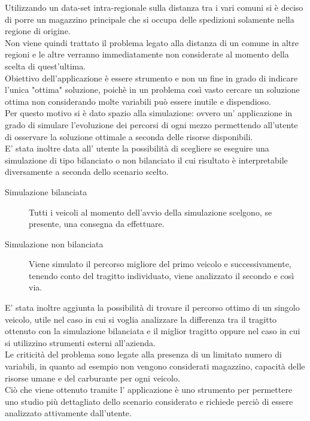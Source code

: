 \documentclass[a4paper,12pt]{report}
\begin{document}
Utilizzando un data-set intra-regionale sulla distanza tra i vari comuni si è deciso di porre un magazzino principale che si occupa delle spedizioni solamente nella regione di origine.\\
Non viene quindi trattato il problema legato alla distanza di un comune in altre regioni e le altre verranno immediatamente non considerate al momento della scelta di quest'ultima.\\
Obiettivo dell'applicazione è essere strumento e non un fine in grado di indicare l'unica "ottima" soluzione, poichè in un problema così vasto cercare un soluzione ottima non considerando 
molte variabili può essere inutile e dispendioso.\\ Per questo motivo si è dato spazio alla simulazione: ovvero un' applicazione in grado di simulare l'evoluzione dei percorsi di ogni mezzo permettendo all'utente di osservare la soluzione ottimale a seconda delle risorse disponibili.\\
E' stata inoltre data all' utente la possibilità di scegliere se eseguire una simulazione di tipo bilanciato o non bilanciato il cui risultato è interpretabile diversamente a seconda dello scenario scelto.
\begin{description}
	\item[Simulazione bilanciata] Tutti i veicoli al momento dell'avvio della simulazione scelgono, se presente, una consegna da effettuare. 
	\item[Simulazione non bilanciata] Viene simulato il percorso migliore del primo veicolo e successivamente, tenendo conto del tragitto individuato, viene analizzato il secondo e così via.
\end{description}
E' stata inoltre aggiunta la possibilità di trovare il percorso ottimo di un singolo veicolo, utile nel caso in cui si voglia analizzare la differenza tra il tragitto ottenuto con la simulazione bilanciata e il miglior tragitto oppure nel caso in cui si utilizzino strumenti esterni all'azienda.\\
Le criticità del problema sono legate alla presenza di un limitato numero di variabili, in quanto ad esempio non vengono considerati magazzino, capacità delle risorse umane e del carburante per ogni veicolo.\\
Ciò che viene ottenuto tramite l' applicazione è uno strumento per permettere uno studio più dettagliato dello scenario considerato e richiede perciò di essere analizzato attivamente dall'utente.
\end{document}
